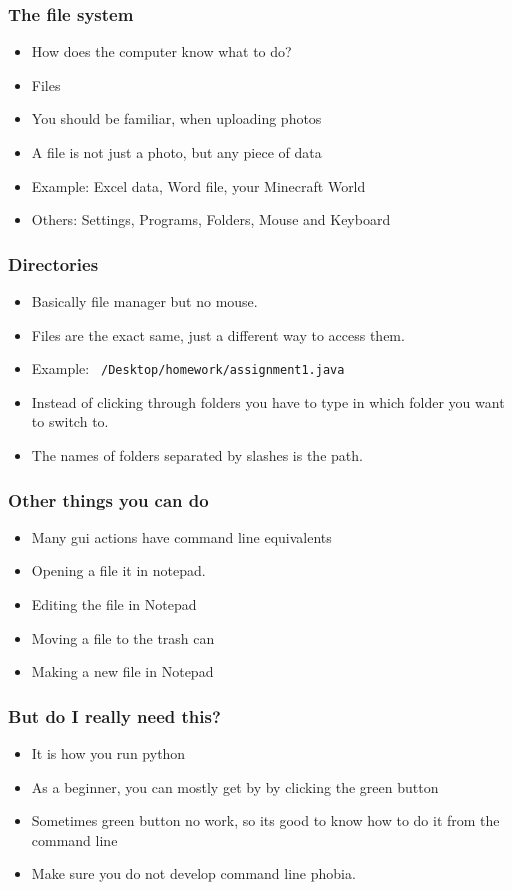 \documentclass[aspectratio=169,hyperref={unicode}]{beamer}
\begin{document}
\begin{frame}[fragile]
\frametitle{The file system}
\begin{itemize}
  \item How does the computer know what to do?
        \item Files
        \item You should be familiar, when uploading photos
        \item A file is not just a photo, but any piece of data
        \item Example: Excel data, Word file, your Minecraft World
        \item Others: Settings, Programs, Folders, Mouse and Keyboard
\end{itemize}
\end{frame}

\begin{frame}[fragile]
\frametitle{Directories}
\begin{itemize}
\item Basically file manager but no mouse.
        \item Files are the exact same, just a different way to access them.
\item Example: \texttt{~/Desktop/homework/assignment1.java}

        \item Instead of clicking through folders you have to type in which folder you want to switch to.
        \item The names of folders separated by slashes is the path.
\end{itemize}
\end{frame}


\begin{frame}[fragile]
\frametitle{Other things you can do}
\begin{itemize}
        \item Many gui actions have command line equivalents
\item Opening a file it in notepad.
  \item Editing the file in Notepad
        \item Moving a file to the trash can
        \item Making a new file in Notepad
\end{itemize}
\end{frame}


\begin{frame}
\frametitle{But do I really need this?}
\begin{itemize}
        \item It is how you run python
\item As a beginner, you can mostly get by by clicking the green button
\item Sometimes green button no work, so its good to know how to do it from the command line
\item Make sure you do not develop command line phobia.
\end{itemize}
\end{frame}
\end{document}
